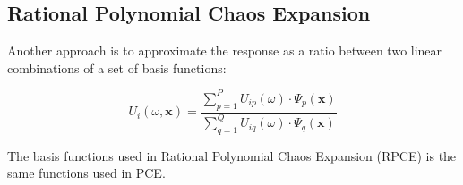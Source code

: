 \subsection{Rational Polynomial Chaos Expansion}

Another approach is to approximate the response as a ratio between two linear combinations of a set of basis functions:

\begin{equation}
    U_{i}(\omega,\mathbf{x}) =
    \frac{
        \sum_{p=1}^{P} U_{ip}(\omega) \cdot \Psi_{p}(\mathbf{x})
    }{
        \sum_{q=1}^{Q} U_{iq}(\omega) \cdot \Psi_{q}(\mathbf{x})
    }
\label{RPCE}
\end{equation}

The basis functions used in Rational Polynomial Chaos Expansion (RPCE) is the same functions used in PCE. 
